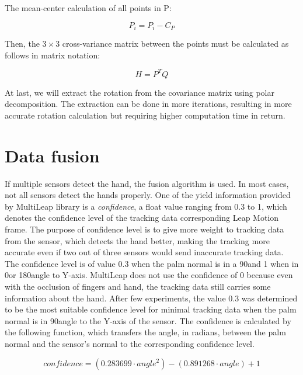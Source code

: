 The mean-center calculation of all points in P:

\begin{equation}
    {P_i = P_i - C_P}
\end{equation}

Then, the $3\times3$ cross-variance matrix between the points must be calculated as follows in matrix notation:

\begin{equation}
    {H = P^T Q}
\end{equation}

At last, we will extract the rotation from the covariance matrix using polar decomposition. The extraction can be done in more iterations, resulting in more accurate rotation calculation but requiring higher computation time in return.

\section{Data fusion}

If multiple sensors detect the hand, the fusion algorithm is used. In most cases, not all sensors detect the hands properly. One of the yield information provided by MultiLeap library is a \textit{confidence}, a float value ranging from 0.3 to 1, which denotes the confidence level of the tracking data corresponding Leap Motion frame. The purpose of confidence level is to give more weight to tracking data from the sensor, which detects the hand better, making the tracking more accurate even if two out of three sensors would send inaccurate tracking data. The confidence level is of value 0.3 when the palm normal is in a 90\textdegree and 1 when in 0\textdegree or 180\textdegree angle to Y-axis. MultiLeap does not use the confidence of 0 because even with the occlusion of fingers and hand, the tracking data still carries some information about the hand. After few experiments, the value 0.3 was determined to be the most suitable confidence level for minimal tracking data when the palm normal is in 90\textdegree angle to the Y-axis of the sensor. The confidence is calculated by the following function, which transfers the angle, in radians, between the palm normal and the sensor's normal to the corresponding confidence level.

\begin{equation}
    {confidence = (0.283699 \cdot angle^2)-(0.891268 \cdot angle)+1}
\end{equation}

